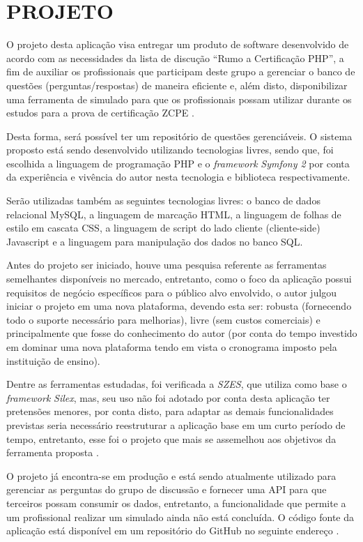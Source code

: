 \chapter{PROJETO}
\label{chp:projeto}
 
O projeto desta aplicação visa entregar um produto de software
desenvolvido de acordo com as necessidades da lista de discução ``Rumo a
Certificação PHP'', a fim de auxiliar os profissionais que participam deste
grupo a gerenciar o banco de questões (perguntas/respostas) de maneira eficiente e,
além disto, disponibilizar uma ferramenta de simulado para que os profissionais 
possam utilizar durante os estudos para a prova de certificação \acs{ZCPE}
\cite{googleGroupsRumoACertificaoPHP}.

Desta forma, será possível ter um repositório de questões gerenciáveis. O
sistema proposto está sendo desenvolvido utilizando tecnologias livres, sendo 
que, foi escolhida a linguagem de programação \acs{PHP} e o
\textit{framework} \textit{Symfony 2} por conta da experiência e vivência do
autor nesta tecnologia e biblioteca respectivamente.

Serão utilizadas também as seguintes tecnologias livres: o banco de dados
relacional MySQL, a linguagem de marcação HTML, a linguagem de folhas de estilo 
em cascata CSS,  a linguagem de script do lado cliente (cliente-side) Javascript 
e a linguagem para manipulação dos dados no banco SQL.

Antes do projeto ser iniciado, houve uma pesquisa referente as ferramentas
semelhantes disponíveis no mercado, entretanto, como o foco da aplicação possui
requisitos de negócio específicos para o público alvo envolvido, o autor julgou
iniciar o projeto em uma nova plataforma, devendo esta ser: robusta (fornecendo
todo o suporte necessário para melhorias), livre (sem custos comerciais) e
principalmente que fosse do conhecimento do autor (por conta do tempo investido
em dominar uma nova plataforma tendo em vista o cronograma imposto pela
instituição de ensino).

Dentre as ferramentas estudadas, foi
verificada a \textit{SZES}, que utiliza como base o \textit{framework}
\textit{Silex}, mas, seu uso não foi adotado por conta desta aplicação
ter pretensões menores, por conta disto, para adaptar as demais funcionalidades
previstas seria necessário reestruturar a aplicação
base em um curto período de tempo, entretanto, esse foi o projeto que mais se
assemelhou aos objetivos da ferramenta proposta \cite{githubSZES}.

O projeto já encontra-se em produção e está sendo atualmente utilizado para 
gerenciar as perguntas do grupo de discussão e fornecer uma \ac{API} para que 
terceiros possam consumir os dados, entretanto, a funcionalidade que permite a
um profissional realizar um simulado ainda não está concluída. O código fonte da
aplicação está disponível em um repositório do GitHub no seguinte endereço 
\cite{githubZCPE}.


